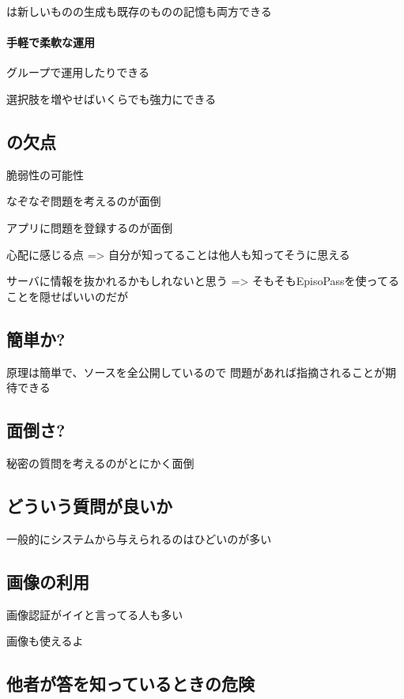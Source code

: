 \documentclass[twoside]{wiss}
\begin{document}
{\EP}は新しいものの生成も既存のものの記憶も両方できる

\paragraph{手軽で柔軟な運用}

グループで運用したりできる

選択肢を増やせばいくらでも強力にできる

\subsection{{\EP}の欠点}

脆弱性の可能性

なぞなぞ問題を考えるのが面倒

アプリに問題を登録するのが面倒

心配に感じる点
 => 自分が知ってることは他人も知ってそうに思える

サーバに情報を抜かれるかもしれないと思う
 => そもそもEpisoPassを使ってることを隠せばいいのだが

\subsection{簡単か?}

原理は簡単で、ソースを全公開しているので
問題があれば指摘されることが期待できる

\subsection{面倒さ?}

秘密の質問を考えるのがとにかく面倒

\subsection{どういう質問が良いか}

一般的にシステムから与えられるのはひどいのが多い

\subsection{画像の利用}

画像認証がイイと言ってる人も多い

画像も使えるよ

\subsection{他者が答を知っているときの危険}
\end{document}
